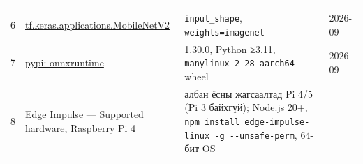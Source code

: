 \begin{longtable}[]{@{}llll@{}}
\begin{minipage}[t]{0.22\columnwidth}
\end{minipage}\tabularnewline
\begin{minipage}[t]{0.22\columnwidth}\raggedright
6\strut
\end{minipage} & \begin{minipage}[t]{0.22\columnwidth}\raggedright
\href{https://www.tensorflow.org/api_docs/python/tf/keras/applications/MobileNetV2}{tf.\allowbreak{}keras.\allowbreak{}applications.\allowbreak{}MobileNetV2}\strut
\end{minipage} & \begin{minipage}[t]{0.22\columnwidth}\raggedright
\texttt{input\_shape}, \texttt{weights=\textquotesingle{}imagenet\textquotesingle{}}\strut
\end{minipage} & \begin{minipage}[t]{0.22\columnwidth}\raggedright
2026-09\strut
\end{minipage}\tabularnewline
\begin{minipage}[t]{0.22\columnwidth}\raggedright
7\strut
\end{minipage} & \begin{minipage}[t]{0.22\columnwidth}\raggedright
\href{https://pypi.org/project/onnxruntime/}{pypi: onnxruntime}\strut
\end{minipage} & \begin{minipage}[t]{0.22\columnwidth}\raggedright
1.30.0, Python ≥3.11, \texttt{manylinux\_\allowbreak{}2\_\allowbreak{}28\_\allowbreak{}aarch64} wheel\strut
\end{minipage} & \begin{minipage}[t]{0.22\columnwidth}\raggedright
2026-09\strut
\end{minipage}\tabularnewline
\begin{minipage}[t]{0.22\columnwidth}\raggedright
8\strut
\end{minipage} & \begin{minipage}[t]{0.22\columnwidth}\raggedright
\href{https://docs.edgeimpulse.com/hardware}{Edge Impulse --- Supported hardware}, \href{https://docs.edgeimpulse.com/hardware/boards/raspberry-pi-4}{Raspberry Pi 4}\strut
\end{minipage} & \begin{minipage}[t]{0.22\columnwidth}\raggedright
албан ёсны жагсаалтад Pi 4/5 (Pi 3 байхгүй); Node.js 20+, \texttt{npm\ install\ edge-impulse-linux\ -g\ -\/\allowbreak{}-unsafe-perm}, 64-бит OS\strut
\end{minipage} & \begin{minipage}[t]{0.22\columnwidth}\raggedright

\end{minipage}
\end{longtable}
